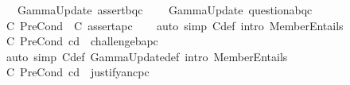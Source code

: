 \begin{isabellebody}
\isamarkupfalse%
\ {\isachardoublequoteopen}{\isasymDelta}\ {\isasymequiv}\ GammaUpdate\ assert{\isacharbrackleft}{\kern0pt}b{\isacharcomma}{\kern0pt}q\isactrlsup c{\isacharbrackright}{\kern0pt}\ {\isasymDelta}\isanewline
{}\isamarkupfalse%
\ {\isachardoublequoteopen}{\isasymDelta}\ {\isasymequiv}\ GammaUpdate\ question{\isacharbrackleft}{\kern0pt}a{\isacharcomma}{\kern0pt}b{\isacharcomma}{\kern0pt}q\isactrlsup c{\isacharbrackright}{\kern0pt}\ {\isasymDelta}\isanewline
\isanewline
{}\isamarkupfalse%
\ C{}{\isacharcolon}{\kern0pt}\ {\isachardoublequoteopen}PreCond\ {\isacharbrackleft}{\kern0pt}{\isacharbrackright}{\kern0pt}\ {\isasymGamma}\isactrlsub C\ assert{\isacharbrackleft}{\kern0pt}a{\isacharcomma}{\kern0pt}p\isactrlsup c{\isacharbrackright}{\kern0pt}{\isachardoublequoteclose}\isanewline
%
\isadelimproof
\ \ %
\endisadelimproof
%
\isatagproof
{}\isamarkupfalse%
\ {\isacharparenleft}{\kern0pt}auto\ simp{\isacharcolon}{\kern0pt}\ {\isasymGamma}\isactrlsub C{\isacharunderscore}{\kern0pt}def\ intro{\isacharbang}{\kern0pt}{\isacharcolon}{\kern0pt}\ MemberEntails{\isacharparenright}{\kern0pt}%
\endisatagproof
{\isafoldproof}%
%
\isadelimproof
\isanewline
%
\endisadelimproof
{}\isamarkupfalse%
\ C{}{\isacharcolon}{\kern0pt}\ {\isachardoublequoteopen}PreCond\ cd\ {\isasymDelta}\ challenge{\isacharbrackleft}{\kern0pt}b{\isacharcomma}{\kern0pt}a{\isacharcomma}{\kern0pt}p\isactrlsup c{\isacharbrackright}{\kern0pt}{\isachardoublequoteclose}\isanewline
%
\isadelimproof
\ \ %
\endisadelimproof
%
\isatagproof
{}\isamarkupfalse%
\ {\isacharparenleft}{\kern0pt}auto\ simp{\isacharcolon}{\kern0pt}\ {\isasymGamma}\isactrlsub C{\isacharunderscore}{\kern0pt}def\ GammaUpdate{\isacharunderscore}{\kern0pt}def\ intro{\isacharbang}{\kern0pt}{\isacharcolon}{\kern0pt}\ MemberEntails{\isacharparenright}{\kern0pt}%
\endisatagproof
{\isafoldproof}%
%
\isadelimproof
\isanewline
%
\endisadelimproof
{}\isamarkupfalse%
\ C{}{\isacharcolon}{\kern0pt}\ {\isachardoublequoteopen}PreCond\ cd\ {\isasymDelta}\ justify{\isacharbrackleft}{\kern0pt}a{\isacharcomma}{\kern0pt}n\isactrlsup c{\isasymturnstile}\isactrlsup {\isasymoplus}p\isactrlsup c{\isacharbrackright}{\kern0pt}{\isachardoublequoteclose}\isanewline

\end{isabellebody}
